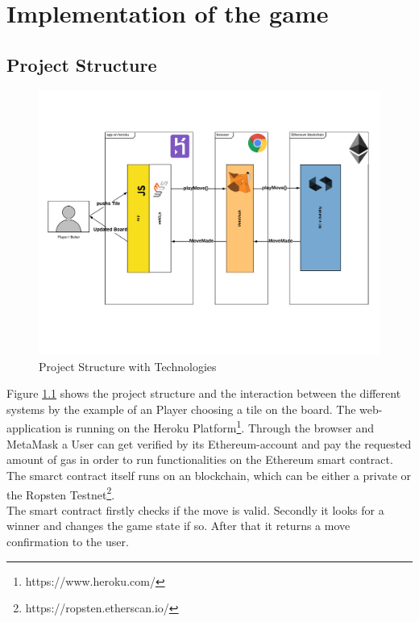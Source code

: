 \chapter{Implementation of the game}\label{ch:implementation}
\section{Project Structure}
	\begin{figure}[ht]
		\begin{center}
			\includegraphics[scale=0.4]{res/project_structure}
		\end{center}
		\caption{Project Structure with Technologies}
		\label{fig:project_structure}
	\end{figure}	
Figure \ref{fig:project_structure} shows the project structure and the interaction between the different systems by the example of an Player choosing a tile on the board.
The web-application is running on the Heroku Platform\footnote{https://www.heroku.com/}. Through the browser and MetaMask a User can get verified by its Ethereum-account and pay the requested amount of gas in order to run functionalities on the Ethereum smart contract. The smarct contract itself runs on an blockchain, which can be either a private or the Ropsten Testnet\footnote{https://ropsten.etherscan.io/}.\\
The smart contract firstly checks if the move is valid. Secondly it looks for a winner and changes the game state if so. After that it returns a move confirmation to the user.
